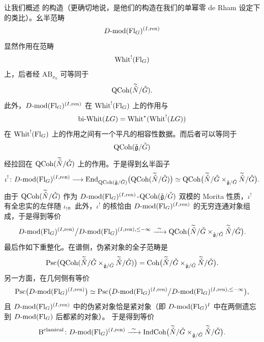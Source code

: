 让我们概述 \cite{DT25} 的构造（更确切地说，是他们的构造在我们的单幂零 de Rham
设定下的类比）。幺半范畴
\[
D\text{-}\mathrm{mod}(\mathrm{Fl}_G)^{(I,\mathrm{ren})}
\]
显然作用在范畴
\[
\mathrm{Whit}^{!}(\mathrm{Fl}_G)
\]
上，后者经 $\mathrm{AB}_{x_0}$ 可等同于
\[
\mathrm{QCoh}(\widetilde{\check N}/\check G).
\]
此外，$D\text{-}\mathrm{mod}(\mathrm{Fl}_G)^{(I,\mathrm{ren})}$ 在 $\mathrm{Whit}^{!}(\mathrm{Fl}_G)$ 上的作用与
\[
\mathrm{bi}\text{-}\mathrm{Whit}(LG)=\mathrm{Whit}^{*}(\mathrm{Whit}^{!}(LG))
\]
在 $\mathrm{Whit}^{!}(\mathrm{Fl}_G)$ 上的作用之间有一个平凡的相容性数据。而后者可以等同于
\[
\mathrm{QCoh}(\check{\mathfrak{g}}/\check G)
\]
经拉回在 $\mathrm{QCoh}(\widetilde{\check N}/\check G)$ 上的作用。于是得到幺半函子
\[
\iota^{!}\colon
D\text{-}\mathrm{mod}(\mathrm{Fl}_G)^{(I,\mathrm{ren})}\longrightarrow
\operatorname{End}_{\mathrm{QCoh}(\check{\mathfrak{g}}/\check G)}
\bigl(\mathrm{QCoh}(\widetilde{\check N}/\check G)\bigr)
\simeq
\mathrm{QCoh}\bigl(\widetilde{\check N}/\check G
\times_{\check{\mathfrak{g}}/\check G}
\widetilde{\check N}/\check G\bigr).
\]
由于 $\mathrm{QCoh}(\widetilde{\check N}/\check G)$ 作为
$D\text{-}\mathrm{mod}(\mathrm{Fl}_G)^{(I,\mathrm{ren})}$-$\mathrm{QCoh}(\check{\mathfrak{g}}/\check G)$
双模的 Morita 性质，$\iota^{!}$ 有全忠实的左伴随 $\iota_!$。此外，$\iota^{!}$ 的核恰由
$D\text{-}\mathrm{mod}(\mathrm{Fl}_G)^{(I,\mathrm{ren})}$ 的无穷连通对象组成，于是得到等价
\[
D\text{-}\mathrm{mod}(\mathrm{Fl}_G)^{(I,\mathrm{ren})}\big/
D\text{-}\mathrm{mod}(\mathrm{Fl}_G)^{(I,\mathrm{ren}),\leq -\infty}
\xrightarrow{\ \sim\ }
\mathrm{QCoh}\bigl(\widetilde{\check N}/\check G
\times_{\check{\mathfrak{g}}/\check G}
\widetilde{\check N}/\check G\bigr).
\]
最后作如下重整化。在谱侧，伪紧对象的全子范畴是
\[
\mathrm{Psc}\bigl(\mathrm{QCoh}(\widetilde{\check N}/\check G
\times_{\check{\mathfrak{g}}/\check G}
\widetilde{\check N}/\check G)\bigr)
=\mathrm{Coh}\bigl(\widetilde{\check N}/\check G
\times_{\check{\mathfrak{g}}/\check G}
\widetilde{\check N}/\check G\bigr).
\]
另一方面，在几何侧有等价
\[
\mathrm{Psc}\bigl(D\text{-}\mathrm{mod}(\mathrm{Fl}_G)^{(I,\mathrm{ren})}\bigr)
\simeq
\mathrm{Psc}\bigl(D\text{-}\mathrm{mod}(\mathrm{Fl}_G)^{(I,\mathrm{ren})}\big/
D\text{-}\mathrm{mod}(\mathrm{Fl}_G)^{(I,\mathrm{ren}),\leq -\infty}\bigr),
\]
且 $D\text{-}\mathrm{mod}(\mathrm{Fl}_G)^{(I,\mathrm{ren})}$ 中的伪紧对象恰是紧对象（即
$D\text{-}\mathrm{mod}(\mathrm{Fl}_G)^{I}$ 中在两侧遗忘到 $D\text{-}\mathrm{mod}(\mathrm{Fl}_G)$ 后都紧的对象）。
于是得到等价
\[
\mathrm{B}^{\mathrm{classical}}\colon
D\text{-}\mathrm{mod}(\mathrm{Fl}_G)^{(I,\mathrm{ren})}
\xrightarrow{\ \sim\ }
\mathrm{IndCoh}\bigl(\widetilde{\check N}/\check G
\times_{\check{\mathfrak{g}}/\check G}
\widetilde{\check N}/\check G\bigr).
\]

